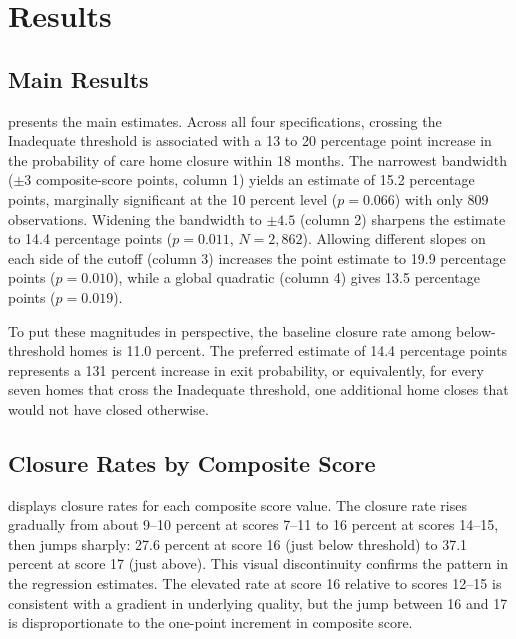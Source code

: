 \documentclass[12pt]{article}
\begin{document}
\section{Results}

\subsection{Main Results}



 presents the main estimates. Across all four specifications, crossing the Inadequate threshold is associated with a 13 to 20 percentage point increase in the probability of care home closure within 18 months. The narrowest bandwidth ($\pm 3$ composite-score points, column 1) yields an estimate of 15.2 percentage points, marginally significant at the 10 percent level ($p = 0.066$) with only 809 observations. Widening the bandwidth to $\pm 4.5$ (column 2) sharpens the estimate to 14.4 percentage points ($p = 0.011$, $N = 2{,}862$). Allowing different slopes on each side of the cutoff (column 3) increases the point estimate to 19.9 percentage points ($p = 0.010$), while a global quadratic (column 4) gives 13.5 percentage points ($p = 0.019$).

To put these magnitudes in perspective, the baseline closure rate among below-threshold homes is 11.0 percent. The preferred estimate of 14.4 percentage points represents a 131 percent increase in exit probability, or equivalently, for every seven homes that cross the Inadequate threshold, one additional home closes that would not have closed otherwise.

\subsection{Closure Rates by Composite Score}



 displays closure rates for each composite score value. The closure rate rises gradually from about 9--10 percent at scores 7--11 to 16 percent at scores 14--15, then jumps sharply: 27.6 percent at score 16 (just below threshold) to 37.1 percent at score 17 (just above). This visual discontinuity confirms the pattern in the regression estimates. The elevated rate at score 16 relative to scores 12--15 is consistent with a gradient in underlying quality, but the jump between 16 and 17 is disproportionate to the one-point increment in composite score.
\end{document}
